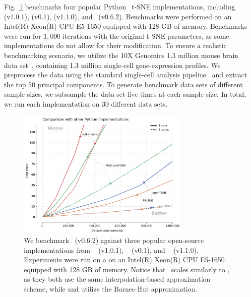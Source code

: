 \documentclass[article]{jss}
\newcommand{\opentsne}{\pkg{openTSNE}}
\begin{document}
Fig.~\ref{fig:benchmarks_py} benchmarks four popular Python~\citep{vanrossum1995python} t-SNE
implementations, including  (v1.0.1), 
(v0.1),  (v1.1.0), and \opentsne\ (v0.6.2). Benchmarks were
performed on an Intel(R) Xeon(R) CPU E5-1650 equipped with 128 GB of memory.
Benchmarks were run for $1,000$ iterations with the original t-SNE parameters,
as some implementations do not allow for their modification. To ensure a
realistic benchmarking scenario, we utilize the 10X Genomics 1.3 million mouse
brain data set~\citep{xxx}, containing 1.3 million single-cell gene-expression
profiles. We preprocess the data using the standard single-cell analysis
pipeline~\citep{xxx} and extract the top 50 principal components. To generate
benchmark data sets of different sample sizes, we subsample the data set five
times at each sample size. In total, we run each implementation on 30 different
data sets.

\begin{figure}[ht]
  \centering
  \includegraphics[width=0.75\textwidth]{benchmarks_python-final}
  \caption{\label{fig:benchmarks_py}
  We benchmark \opentsne\ (v0.6.2) against three popular open-source
  implementations from ~\citep{pedregosa2011scikit}
  (v1.0.1), ~\citep{Ulyanov2016} (v0.1), and
  ~\citep{linderman2019fast} (v1.1.0). Experiments were run on a
  on an Intel(R) Xeon(R) CPU E5-1650 equipped with 128 GB of memory. Notice
  that \opentsne\ scales similarly to , as they both use the
  same interpolation-based approximation scheme, while  and
   utilize the Barnes-Hut approximation.
}
\end{figure}
\end{document}
